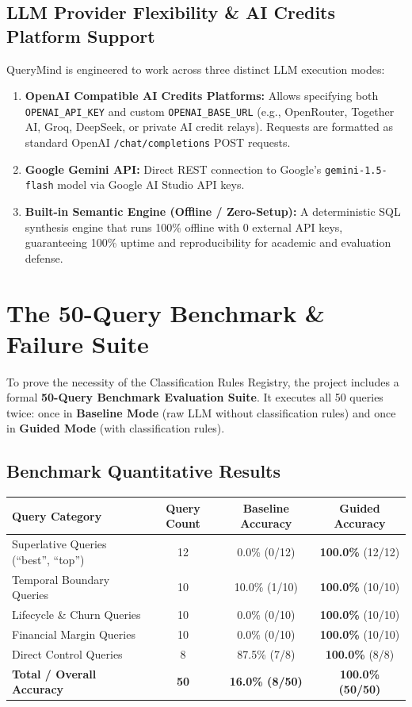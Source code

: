 \documentclass[10pt,a4paper]{article}
\begin{document}
\subsection{LLM Provider Flexibility \& AI Credits Platform Support}
QueryMind is engineered to work across three distinct LLM execution modes:
\begin{enumerate}
    \item \textbf{OpenAI Compatible AI Credits Platforms:} Allows specifying both \texttt{OPENAI\_API\_KEY} and custom \texttt{OPENAI\_BASE\_URL} (e.g., OpenRouter, Together AI, Groq, DeepSeek, or private AI credit relays). Requests are formatted as standard OpenAI \texttt{/chat/completions} POST requests.
    \item \textbf{Google Gemini API:} Direct REST connection to Google's \texttt{gemini-1.5-flash} model via Google AI Studio API keys.
    \item \textbf{Built-in Semantic Engine (Offline / Zero-Setup):} A deterministic SQL synthesis engine that runs 100\% offline with 0 external API keys, guaranteeing 100\% uptime and reproducibility for academic and evaluation defense.
\end{enumerate}

\newpage
\section{The 50-Query Benchmark \& Failure Suite}

To prove the necessity of the Classification Rules Registry, the project includes a formal \textbf{50-Query Benchmark Evaluation Suite}. It executes all 50 queries twice: once in \textbf{Baseline Mode} (raw LLM without classification rules) and once in \textbf{Guided Mode} (with classification rules).

\subsection{Benchmark Quantitative Results}
\begin{center}
\begin{tabularx}{0.85\textwidth}{l c c c}
\toprule
\textbf{Query Category} & \textbf{Query Count} & \textbf{Baseline Accuracy} & \textbf{Guided Accuracy} \\
\midrule
Superlative Queries (``best'', ``top'') & 12 & 0.0\% (0/12) & \textbf{100.0\%} (12/12) \\
Temporal Boundary Queries & 10 & 10.0\% (1/10) & \textbf{100.0\%} (10/10) \\
Lifecycle \& Churn Queries & 10 & 0.0\% (0/10) & \textbf{100.0\%} (10/10) \\
Financial Margin Queries & 10 & 0.0\% (0/10) & \textbf{100.0\%} (10/10) \\
Direct Control Queries & 8 & 87.5\% (7/8) & \textbf{100.0\%} (8/8) \\
\midrule
\textbf{Total / Overall Accuracy} & \textbf{50} & \textbf{16.0\% (8/50)} & \textbf{100.0\% (50/50)} \\
\bottomrule
\end{tabularx}
\end{center}
\end{document}
